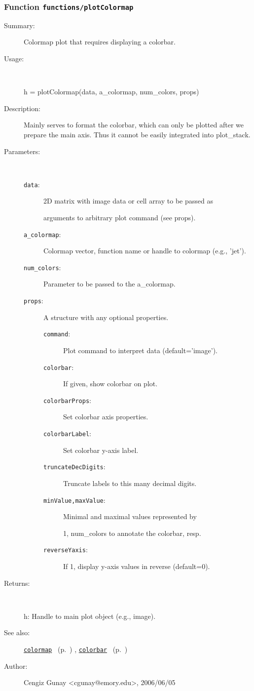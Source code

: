 \subsubsection[Function \texttt{plotColormap}]{Function \texttt{functions/plotColormap}}%
%
\label{ref_functions__plotColormap}%
\hypertarget{ref_functions__plotColormap}{}%
\begin{description}
\item[Summary:]Colormap plot that requires displaying a colorbar.
%
\item[Usage:]~%
\begin{lyxcode}%
h = plotColormap(data, a\_colormap, num\_colors, props)
%
\end{lyxcode}%
%
\item[Description:]%
Mainly serves to format the colorbar, which can only be plotted after
 we prepare the main axis. Thus it cannot be easily integrated into
 plot\_stack. 
\item[Parameters:]~
\begin{description}%
\item[\texttt{data}:]
 2D matrix with image data or cell array to be passed as

arguments to arbitrary plot command (see props).
\item[\texttt{a\_colormap}:]
 Colormap vector, function name or handle to colormap (e.g., 'jet').
\item[\texttt{num\_colors}:]
 Parameter to be passed to the a\_colormap.
\item[\texttt{props}:]
 A structure with any optional properties.
\begin{description}%
\item[\texttt{command}:]
 Plot command to interpret data (default='image').
\item[\texttt{colorbar}:]
 If given, show colorbar on plot.
\item[\texttt{colorbarProps}:]
 Set colorbar axis properties.
\item[\texttt{colorbarLabel}:]
 Set colorbar y-axis label.
\item[\texttt{truncateDecDigits}:]
 Truncate labels to this many decimal digits.
\item[\texttt{minValue,maxValue}:]
 Minimal and maximal values represented by

1, num\_colors to annotate the colorbar, resp.
\item[\texttt{reverseYaxis}:]
 If 1, display y-axis values in reverse (default=0).
\end{description}%
\end{description}%
%
\item[Returns:
]~

   h: Handle to main plot object (e.g., image).
%
%
\item[See also:]%
\hyperlink{ref_colormap}{\texttt{colormap}}%
\ (p.~\pageref{ref_colormap})%
%
, \hyperlink{ref_colorbar}{\texttt{colorbar}}%
\ (p.~\pageref{ref_colorbar})%
%
%
\item[Author:]%
Cengiz Gunay <cgunay@emory.edu>, 2006/06/05
%
\end{description}
\methodline%

